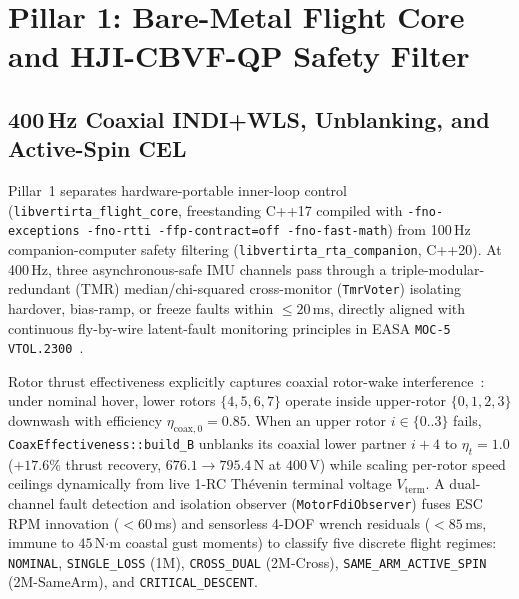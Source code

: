 \documentclass[conference,10pt]{IEEEtran}
\begin{document}
\section{Pillar 1: Bare-Metal Flight Core and HJI-CBVF-QP Safety Filter}
\label{sec:pillar1}

\subsection{400\,Hz Coaxial INDI+WLS, Unblanking, and Active-Spin CEL}

Pillar~1 separates hardware-portable inner-loop control (\texttt{libvertirta\_flight\_core}, freestanding C++17 compiled with \texttt{-fno-exceptions -fno-rtti -ffp-contract=off -fno-fast-math}) from 100\,Hz companion-computer safety filtering (\texttt{libvertirta\_rta\_companion}, C++20). At 400\,Hz, three asynchronous-safe IMU channels pass through a triple-modular-redundant (TMR) median/chi-squared cross-monitor (\texttt{TmrVoter}) isolating hardover, bias-ramp, or freeze faults within $\le 20$\,ms, directly aligned with continuous fly-by-wire latent-fault monitoring principles in EASA \texttt{MOC-5 VTOL.2300}~\cite{easa_moc5_2026}.

Rotor thrust effectiveness explicitly captures coaxial rotor-wake interference~\cite{leishman_principles_2006}: under nominal hover, lower rotors $\{4,5,6,7\}$ operate inside upper-rotor $\{0,1,2,3\}$ downwash with efficiency $\eta_{\text{coax},0}=0.85$. When an upper rotor $i\in\{0..3\}$ fails, \texttt{CoaxEffectiveness::build\_B} unblanks its coaxial lower partner $i+4$ to $\eta_t=1.0$ ($+17.6\%$ thrust recovery, $676.1\to 795.4$\,N at $400$\,V) while scaling per-rotor speed ceilings dynamically from live 1-RC Th\'evenin terminal voltage $V_{\text{term}}$. A dual-channel fault detection and isolation observer (\texttt{MotorFdiObserver}) fuses ESC RPM innovation ($<60$\,ms) and sensorless 4-DOF wrench residuals ($<85$\,ms, immune to $45$\,N$\cdot$m coastal gust moments) to classify five discrete flight regimes: \texttt{NOMINAL}, \texttt{SINGLE\_LOSS} (1M), \texttt{CROSS\_DUAL} (2M-Cross), \texttt{SAME\_ARM\_ACTIVE\_SPIN} (2M-SameArm), and \texttt{CRITICAL\_DESCENT}.
\end{document}
